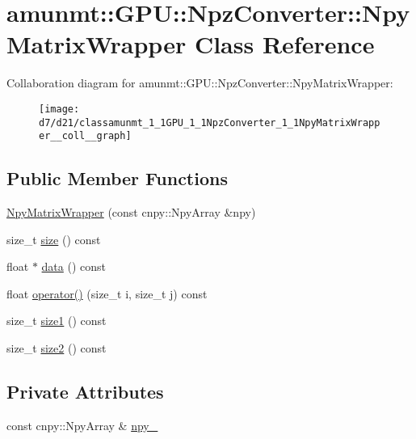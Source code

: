 \hypertarget{classamunmt_1_1GPU_1_1NpzConverter_1_1NpyMatrixWrapper}{}\section{amunmt\+:\+:G\+PU\+:\+:Npz\+Converter\+:\+:Npy\+Matrix\+Wrapper Class Reference}
\label{classamunmt_1_1GPU_1_1NpzConverter_1_1NpyMatrixWrapper}


Collaboration diagram for amunmt\+:\+:G\+PU\+:\+:Npz\+Converter\+:\+:Npy\+Matrix\+Wrapper\+:
\nopagebreak
\begin{figure}[H]
\begin{center}
\leavevmode
\texttt{[image: d7/d21/classamunmt\_1\_1GPU\_1\_1NpzConverter\_1\_1NpyMatrixWrapper\_\_coll\_\_graph]}
\end{center}
\end{figure}
\subsection*{Public Member Functions}
\begin{DoxyCompactItemize}
\item 
\hyperlink{classamunmt_1_1GPU_1_1NpzConverter_1_1NpyMatrixWrapper_a34e7df7be8aa7f118d8e9b00b42f9f7e}{Npy\+Matrix\+Wrapper} (const cnpy\+::\+Npy\+Array \&npy)
\item 
size\+\_\+t \hyperlink{classamunmt_1_1GPU_1_1NpzConverter_1_1NpyMatrixWrapper_a000c809949a76b3d46a95d1945c4f431}{size} () const 
\item 
float $\ast$ \hyperlink{classamunmt_1_1GPU_1_1NpzConverter_1_1NpyMatrixWrapper_a0d8bf20456bf15f3dddfd0663a57e3b0}{data} () const 
\item 
float \hyperlink{classamunmt_1_1GPU_1_1NpzConverter_1_1NpyMatrixWrapper_a78ebad93add1ed2586e70126917ed887}{operator()} (size\+\_\+t i, size\+\_\+t j) const 
\item 
size\+\_\+t \hyperlink{classamunmt_1_1GPU_1_1NpzConverter_1_1NpyMatrixWrapper_ac8c242dc2da5e984e7b18f64e5931ed4}{size1} () const 
\item 
size\+\_\+t \hyperlink{classamunmt_1_1GPU_1_1NpzConverter_1_1NpyMatrixWrapper_a7152ffabd4b46c9ece7321cacf39eaf6}{size2} () const 
\end{DoxyCompactItemize}
\subsection*{Private Attributes}
\begin{DoxyCompactItemize}
\item 
const cnpy\+::\+Npy\+Array \& \hyperlink{classamunmt_1_1GPU_1_1NpzConverter_1_1NpyMatrixWrapper_aa2c8adb7f7950ccdbb0f7fe9144dd757}{npy\+\_\+}
\end{DoxyCompactItemize}


